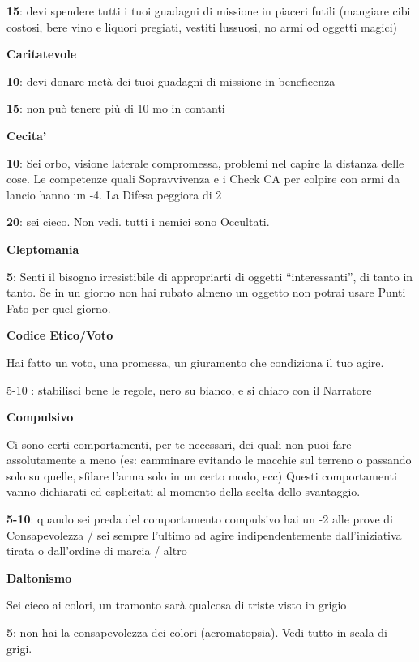 \documentclass[a4paper,11pt,twoside,openany]{book}
\begin{document}
{\textbf{15}: devi spendere tutti i tuoi guadagni di missione in piaceri futili (mangiare cibi costosi, bere vino e liquori pregiati, vestiti lussuosi, no armi od oggetti magici)

\textbf{Caritatevole}

\textbf{10}: devi donare metà dei tuoi guadagni di missione in beneficenza

\textbf{15}: non può tenere più di 10 mo in contanti

\textbf{Cecita'}

\textbf{10}: Sei orbo, visione laterale compromessa, problemi nel capire la distanza delle cose.
Le competenze quali Sopravvivenza e i Check CA per colpire con armi da lancio hanno
un -4. La Difesa peggiora di 2

\textbf{20}: sei cieco. Non vedi. tutti i nemici sono Occultati.

\textbf{Cleptomania}

\textbf{5}: Senti il bisogno irresistibile di appropriarti di oggetti “interessanti”, di tanto in tanto. Se in un giorno non hai rubato almeno un oggetto non potrai usare Punti Fato per quel giorno.

\textbf{Codice Etico/Voto}

Hai fatto un voto, una promessa, un giuramento che condiziona il tuo agire.

5-10 : stabilisci bene le regole, nero su bianco, e si chiaro con il Narratore

\textbf{Compulsivo}

Ci sono certi comportamenti, per te necessari, dei quali non puoi fare assolutamente a meno (es: camminare evitando le macchie sul terreno o passando solo su quelle, sfilare l'arma solo in un certo modo, ecc) 
Questi comportamenti vanno dichiarati ed esplicitati al momento della scelta dello svantaggio.

\textbf{5-10}: quando sei preda del comportamento compulsivo hai un -2 alle prove di Consapevolezza / sei sempre l'ultimo ad agire indipendentemente dall'iniziativa tirata o dall'ordine di marcia / altro

\textbf{Daltonismo}

Sei cieco ai colori, un tramonto sarà qualcosa di triste visto in grigio

\textbf{5}: non hai la consapevolezza dei colori (acromatopsia). Vedi tutto in scala di grigi.

}
\end{document}
